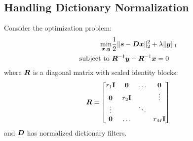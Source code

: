 \subsection{Handling Dictionary Normalization}
Consider the optimization problem:
%
\begin{equation}
\begin{aligned}
\min_{\bm{x},\bm{y}} & \frac{1}{2}\|\bm{s} -\bm{D}\bm{x}\|_2^2 + \lambda\|\bm{y}\|_1 \\
\text{subject to } & \bm{R}^{-1}\bm{y} - \bm{R}^{-1}\bm{x} = 0 
\end{aligned}
\end{equation}
%
where $\bm{R}$ is a diagonal matrix with scaled identity blocks:
%
\begin{equation}
\bm{R} = \begin{bmatrix} r_1{\bf I} & \bm{0} & \hdots & \bm{0} \\ \bm{0} & r_2{\bf I} &  & \vdots \\ \vdots &  & \ddots &   \\ \bm{0} & \hdots &  & r_M{\bf I} \end{bmatrix}
\end{equation}
%
and $\bm{D}$ has normalized dictionary filters.


